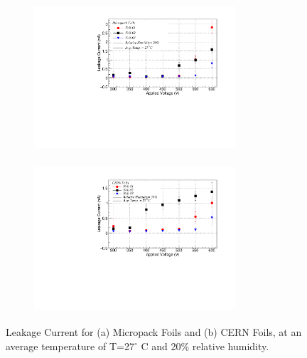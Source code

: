 \begin{figure}[!htbp]
    \centering
    \begin{subfigure}[b]{0.5\textwidth}
        \includegraphics[width=7.5cm, height=5.5cm]{figures/GEM/figures/Fig_11(a).pdf}
        \caption{ }
        \label{fig:Indian_foils_H20}
    \end{subfigure}
    \begin{subfigure}[b]{0.46\textwidth}
        \includegraphics[width=7.5cm, height=5.5cm]{figures/GEM/figures/Fig_11(b).pdf} 
        \caption{ }
        \label{fig:CERN_foils}
    \end{subfigure}
   \caption{Leakage Current for (a) Micropack Foils and (b) CERN Foils, at an average temperature of T=27$^{\circ}$ C and 20\% relative humidity.} \label{fig:L_01}
\end{figure}




